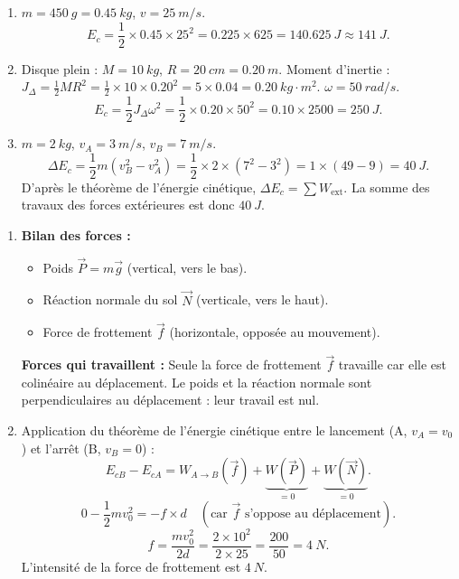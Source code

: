 \documentclass[11pt]{article}
\newcounter{popsec}
\newcounter{popsub}
\newcommand{\courssub}[1]{%
  \stepcounter{popsub}%
  \par\vspace{9pt}\noindent{\popxbold\fontsize{11.5}{13}\selectfont\color{popink}{\color{poporange}\thepopsec.\thepopsub}\hspace{6pt}#1}\par\nopagebreak\vspace{4pt}
}
\begin{document}
\begin{corrige}
\begin{enumerate}
\item $m = \SI{450}{g} = \SI{0,45}{kg}$, $v = \SI{25}{m/s}$.
\[
E_c = \frac{1}{2} \times \num{0,45} \times 25^2 = \num{0,225} \times 625 = \SI{140,625}{J} \approx \SI{141}{J}.
\]
\item Disque plein : $M = \SI{10}{kg}$, $R = \SI{20}{cm} = \SI{0,20}{m}$.
Moment d'inertie : $J_{\Delta} = \frac{1}{2}MR^2 = \frac{1}{2} \times 10 \times \num{0,20}^2 = 5 \times \num{0,04} = \SI{0,20}{kg\cdot m^2}$.
$\omega = \SI{50}{rad/s}$.
\[
E_c = \frac{1}{2}J_{\Delta}\omega^2 = \frac{1}{2} \times \num{0,20} \times 50^2 = \num{0,10} \times 2500 = \SI{250}{J}.
\]
\item $m = \SI{2}{kg}$, $v_A = \SI{3}{m/s}$, $v_B = \SI{7}{m/s}$.
\[
\Delta E_c = \frac{1}{2}m(v_B^2 - v_A^2) = \frac{1}{2} \times 2 \times (7^2 - 3^2) = 1 \times (49 - 9) = \SI{40}{J}.
\]
D'après le théorème de l'énergie cinétique, $\Delta E_c = \sum W_{\text{ext}}$. La somme des travaux des forces extérieures est donc \textbf{$\SI{40}{J}$}.
\end{enumerate}
\end{corrige}

\courssub{Je m'entraîne}

\begin{corrige}
\begin{enumerate}
\item \textbf{Bilan des forces :}
\begin{itemize}
\item Poids $\vec{P} = m\vec{g}$ (vertical, vers le bas).
\item Réaction normale du sol $\vec{N}$ (verticale, vers le haut).
\item Force de frottement $\vec{f}$ (horizontale, opposée au mouvement).
\end{itemize}
\textbf{Forces qui travaillent :} Seule la force de frottement $\vec{f}$ travaille car elle est colinéaire au déplacement. Le poids et la réaction normale sont perpendiculaires au déplacement : leur travail est nul.
\item Application du théorème de l'énergie cinétique entre le lancement (A, $v_A = v_0$) et l'arrêt (B, $v_B = 0$) :
\[
E_{cB} - E_{cA} = W_{A\to B}(\vec{f}) + \underbrace{W(\vec{P})}_{=0} + \underbrace{W(\vec{N})}_{=0}.
\]
\[
0 - \frac{1}{2}mv_0^2 = -f \times d \quad (\text{car } \vec{f} \text{ s'oppose au déplacement}).
\]
\[
f = \frac{mv_0^2}{2d} = \frac{2 \times 10^2}{2 \times 25} = \frac{200}{50} = \SI{4}{N}.
\]
L'intensité de la force de frottement est \textbf{$\SI{4}{N}$}.
\end{enumerate}
\end{corrige}
\end{document}
